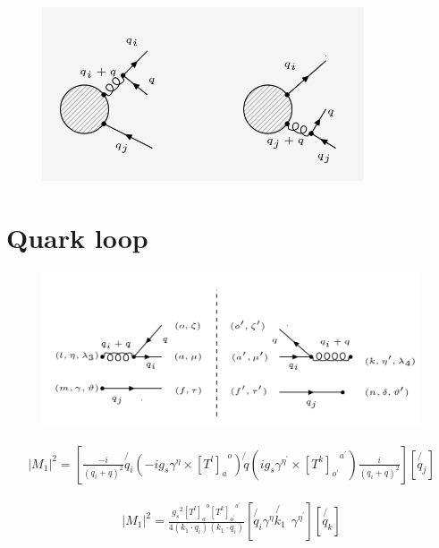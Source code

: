 
\begin{figure}[ht!]
\centering
\includegraphics[width=0.85\textwidth]{images/QG/QGDiagrams.png}
\end{figure}
\pagebreak

\section{Quark loop}
\begin{figure}[ht!]
\centering
\includegraphics[scale=0.7]{images/QG/M1Squer.png}
\end{figure}

\begin{equation}
\begin{split}
|M_1|^2=[\frac{-i}{(q_i +q)^2}\not{q_i}(-ig_s {\gamma}^{\eta}\times{[T^l]_a}^o)\not{q}(ig_s {\gamma}^{{\eta}^{\prime}}\times{[T^k]_{o^{\prime}}}^{a^{\prime}})\frac{i}{(q_i +q)^2}][\not{q_j}]
\end{split}
\end{equation}


\begin{equation}
\begin{split}
|M_1|^2=\frac{{g_s}^2 {[T^l]_a}^o {[T^k]_{o^{\prime}}}^{a^{\prime}}}{4(k_1 \cdot q_i)(k_1 \cdot q_i)}[\not{q_i}{\gamma}^{\eta}\not{k_1}\:\: {\gamma}^{{\eta}^{\prime}}][\not{q_k}]
\end{split}
\end{equation}


